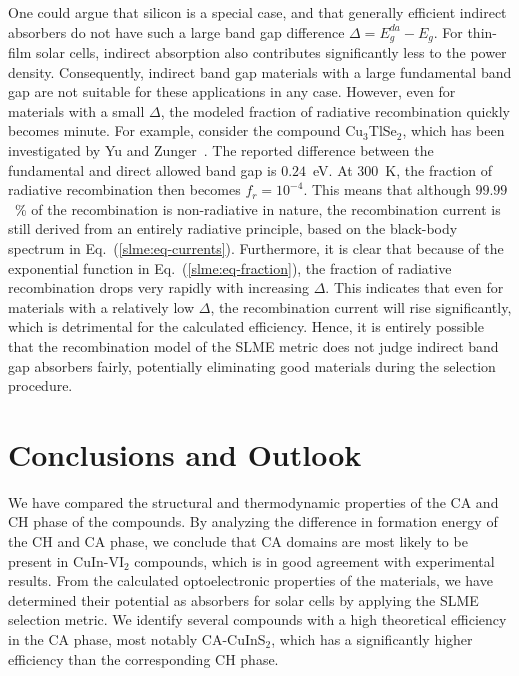\begin{refsection}
One could argue that silicon is a special case, and that generally efficient 
indirect absorbers do not have such a large band gap difference \mbox{$\Delta 
= E_g ^{da}- E_g$}. For thin-film solar cells, indirect absorption also 
contributes significantly less to the power density. Consequently, indirect 
band gap materials with a large fundamental band gap are not suitable for 
these applications in any case. However, even for materials with a small 
$\Delta$, the modeled fraction of radiative recombination quickly becomes 
minute. For example, consider the compound Cu$_3$TlSe$_2$, which has been 
investigated by Yu and Zunger~\cite{Yu2012}. The reported difference between 
the fundamental and direct allowed band gap is $0.24$~\si{\electronvolt}. At 
300~\si{\kelvin}, the fraction of radiative recombination then becomes 
\mbox{$f_r = 10^{-4}$}. This means that although $99.99$~\% of the 
recombination is non-radiative in nature, the recombination current is 
still derived from an entirely radiative principle, based on the black-body 
spectrum in Eq.~(\ref{slme:eq-currents}). Furthermore, it is clear that 
because of the exponential function in Eq.~(\ref{slme:eq-fraction}), the 
fraction of radiative recombination drops very rapidly with increasing 
$\Delta$. This indicates that even for materials with a relatively low 
$\Delta$, the recombination current will rise significantly, which is 
detrimental for the calculated efficiency. Hence, it is entirely possible that 
the recombination model of the \gls{SLME} metric does not judge indirect band gap 
absorbers fairly, potentially eliminating good materials during the selection 
procedure.\\ 
 
\section{Conclusions and Outlook} 
 
We have compared the structural and thermodynamic properties of the \gls{CA} and \gls{CH} 
phase of the compounds. By analyzing the difference in formation energy of the 
CH and \gls{CA} phase, we conclude that \gls{CA} domains are most likely to be present in 
\mbox{CuIn-VI$_2$} compounds, which is in good agreement with experimental 
results. From the calculated optoelectronic properties of the materials, we 
have determined their potential as absorbers for solar cells by applying the 
SLME selection metric. We identify several compounds with a high theoretical 
efficiency in the \gls{CA} phase, most notably \mbox{CA-CuInS$_2$}, which has a 
significantly higher efficiency than the corresponding \gls{CH} phase. 
 

\end{refsection}
